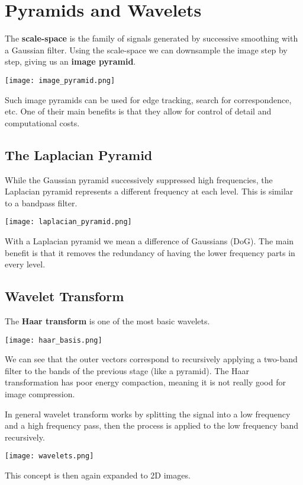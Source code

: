 \section{Pyramids and Wavelets}

The \textbf{scale-space} is the family of signals generated by successive smoothing with a Gaussian filter. Using the scale-space we can downsample the image step by step, giving us an \textbf{image pyramid}.
\begin{center}
	\texttt{[image: image\_pyramid.png]}
\end{center}

Such image pyramids can be used for edge tracking, search for correspondence, etc. One of their main benefits is that they allow for control of detail and computational costs. 


\subsection{The Laplacian Pyramid}

While the Gaussian pyramid successively suppressed high frequencies, the Laplacian pyramid represents a different frequency at each level. This is similar to a bandpass filter.
\begin{center}
	\texttt{[image: laplacian\_pyramid.png]}
\end{center}

With a Laplacian pyramid we mean a difference of Gaussians (DoG). The main benefit is that it removes the redundancy of having the lower frequency parts in every level.


\subsection{Wavelet Transform}

The \textbf{Haar transform} is one of the most basic wavelets.
\begin{center}
	\texttt{[image: haar\_basis.png]}
\end{center}

We can see that the outer vectors correspond to recursively applying a two-band filter to the bands of the previous stage (like a pyramid). The Haar transformation has poor energy compaction, meaning it is not really good for image compression. \medskip

In general wavelet transform works by splitting the signal into a low frequency and a high frequency pass, then the process is applied to the low frequency band recursively.
\begin{center}
	\texttt{[image: wavelets.png]}
\end{center}

This concept is then again expanded to 2D images.